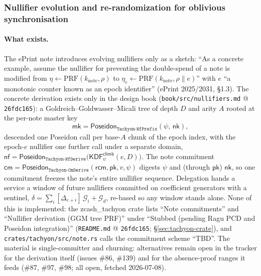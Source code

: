 \documentclass[11pt,a4paper]{article}
\theoremstyle{definition}
\newcommand{\nfsym}{\mathsf{nf}}
\newcommand{\cmsym}{\mathsf{cm}}
\newcommand{\nksym}{\ensuremath{\mathsf{nk}}}
\newcommand{\rcm}{\ensuremath{\mathsf{rcm}}}
\begin{document}
\subsubsection{Nullifier evolution and re-randomization for oblivious
synchronisation}\label{sec:tachyon-dbu-nf}

\paragraph{What exists.} The ePrint note introduces evolving nullifiers only
as a sketch: ``As a concrete example, assume the nullifier for preventing
the double-spend of a note is modified from $\eta \leftarrow
\mathrm{PRF}(k_{\mathrm{note}}, \rho)$ to $\eta_e \leftarrow
\mathrm{PRF}(k_{\mathrm{note}}, \rho \| e)$'' with $e$ ``a monotonic counter
known as an epoch identifier'' (ePrint 2025/2031, \S1.3). The concrete
derivation exists only in the design book
(\texttt{book/src/nullifiers.md} @ \texttt{26fdc165}): a
Goldreich--Goldwasser--Micali tree of depth $D$ and arity $A$ rooted at the
per-note master key
\[
\mathsf{mk} = \mathsf{Poseidon}_{\texttt{Tachyon-NfPrefix}}(\psi,\, \nksym),
\]
descended one Poseidon call per base-$A$ chunk of the epoch index, with the
epoch-$e$ nullifier one further call under a separate domain,
$\nfsym = \mathsf{Poseidon}_{\texttt{Tachyon-NfDerive}}\!\bigl(
\mathsf{KDF}^{\mathsf{climb}}_\psi(e, D)\bigr)$. The note commitment
$\cmsym = \mathsf{Poseidon}_{\texttt{Tachyon-CmDerive}}(\rcm, \mathsf{pk},
v, \psi)$ digests $\psi$ and (through $\mathsf{pk}$) $\nksym$, so one
commitment freezes the note's entire nullifier sequence. Delegation hands a
service a window of future nullifiers committed on coefficient generators
with a sentinel, $\delta = \sum_i [\Delta_{e+i}]\,\mathcal{G}_i +
\mathcal{G}_d$, re-based so any window stands alone. None of this is
implemented: the \textsf{zcash\_tachyon} crate lists ``Note commitments''
and ``Nullifier derivation (GGM tree PRF)'' under ``Stubbed (pending Ragu
PCD and Poseidon integration)'' (\texttt{README.md} @ \texttt{26fdc165};
\S\ref{sec:tachyon-crate}), and \texttt{crates/tachyon/src/note.rs} calls
the commitment scheme ``TBD''. The material is single-committer and
churning: alternatives remain open in the tracker for the derivation itself
(issues \#86, \#139) and for the absence-proof ranges it feeds (\#87, \#97,
\#98; all open, fetched 2026-07-08).
\end{document}
